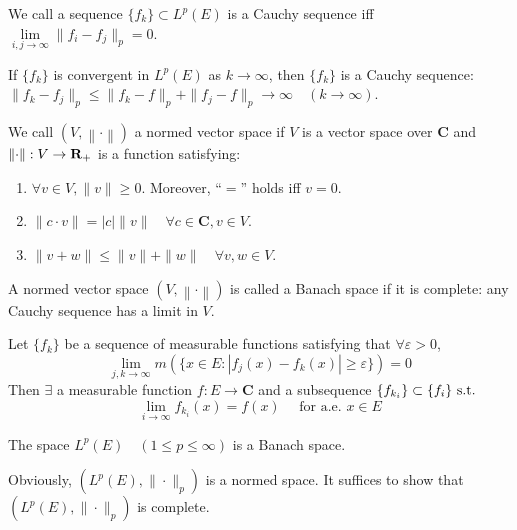 \documentclass{article}
\begin{document}
\begin{Def}
We call a sequence $\{f_k\}\subset L^p(E)$ is a Cauchy sequence iff $\lim\limits_{i,j\to\infty}\|f_i-f_j\|_p=0$.
\end{Def}

If $\{f_k\}$ is convergent in $L^p(E)$ as $k\to \infty$, then $\{f_k\}$ is a Cauchy sequence: $\|f_k-f_j\|_p\leq \|f_k-f\|_p+\|f_j-f\|_p\to \infty\quad (k\to \infty)$.

\begin{Def}
We call $(V,\left\|\cdot\right\|)$ a normed vector space if $V$ is a vector space over $\mathbf{C}$ and $\left\|\cdot\right\|:V\to \mathbf{R}_+$ is a function satisfying:
\begin{enumerate}
\item $\forall v\in V,\|v\|\geq 0$. Moreover, ``$=$'' holds iff $v=0$.
\item $\|c\cdot v\|=|c|\|v\|\quad\forall c\in\mathbf{C}, v\in V$.
\item $\|v+w\|\leq \|v\|+\|w\|\quad\forall v,w\in V$.
\end{enumerate}
A normed vector space $(V,\left\|\cdot\right\|)$ is called a Banach space if it is complete: any Cauchy sequence has a limit in $V$. 
\end{Def}

\begin{Lemma}
Let $\{f_k\}$ be a sequence of measurable functions satisfying that $\forall \varepsilon>0$,
\[\lim_{j,k\to\infty}m(\{x\in E:|f_j(x)-f_k(x)|\geq\varepsilon\})=0\]
Then $\exists$ a measurable function $f:E\to \mathbf{C}$ and a subsequence $\{f_{k_i}\}\subset \{f_i\}\text{ s.t. }$
\[\lim_{i\to\infty}f_{k_i}(x)=f(x)\quad \text{ for a.e. } x\in E\]
\end{Lemma}

\begin{Thm}
The space $L^p(E)\quad(1\leq p\leq \infty)$ is a Banach space.
\end{Thm}
Obviously, $(L^p(E),\|\cdot\|_p)$ is a normed space. It suffices to show that $(L^p(E),\|\cdot\|_p)$ is complete.
\end{document}
